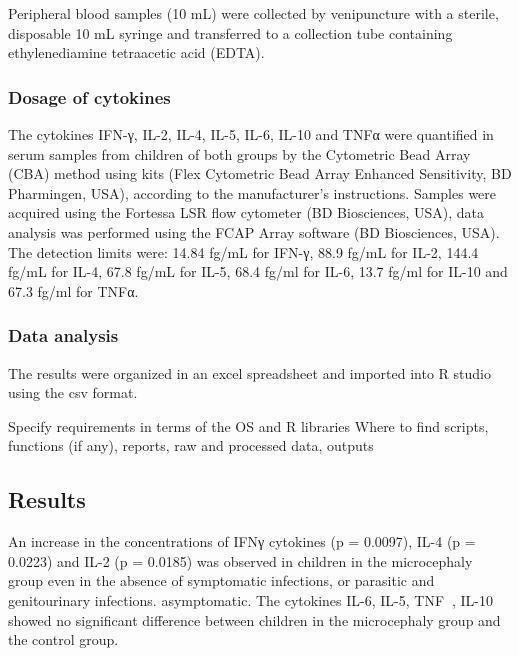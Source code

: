 \documentclass[
]{article}
\begin{document}
Peripheral blood samples (10 mL) were collected by venipuncture with a
sterile, disposable 10 mL syringe and transferred to a collection tube
containing ethylenediamine tetraacetic acid (EDTA).

\hypertarget{dosage-of-cytokines}{%
\subsubsection{Dosage of cytokines}\label{dosage-of-cytokines}}

The cytokines IFN-γ, IL-2, IL-4, IL-5, IL-6, IL-10 and TNFα were
quantified in serum samples from children of both groups by the
Cytometric Bead Array (CBA) method using kits (Flex Cytometric Bead
Array Enhanced Sensitivity, BD Pharmingen, USA), according to the
manufacturer's instructions. Samples were acquired using the Fortessa
LSR flow cytometer (BD Biosciences, USA), data analysis was performed
using the FCAP Array software (BD Biosciences, USA). The detection
limits were: 14.84 fg/mL for IFN-γ, 88.9 fg/mL for IL-2, 144.4 fg/mL for
IL-4, 67.8 fg/mL for IL-5, 68.4 fg/ml for IL-6, 13.7 fg/ml for IL-10 and
67.3 fg/ml for TNFα.

\hypertarget{data-analysis}{%
\subsubsection{Data analysis}\label{data-analysis}}

The results were organized in an excel spreadsheet and imported into R
studio using the csv format.

Specify requirements in terms of the OS and R libraries Where to find
scripts, functions (if any), reports, raw and processed data, outputs

\hypertarget{results}{%
\subsection{Results}\label{results}}

An increase in the concentrations of IFNγ cytokines (p = 0.0097), IL-4
(p = 0.0223) and IL-2 (p = 0.0185) was observed in children in the
microcephaly group even in the absence of symptomatic infections, or
parasitic and genitourinary infections. asymptomatic. The cytokines
IL-6, IL-5, TNF, IL-10 showed no significant difference between
children in the microcephaly group and the control group.
\end{document}
